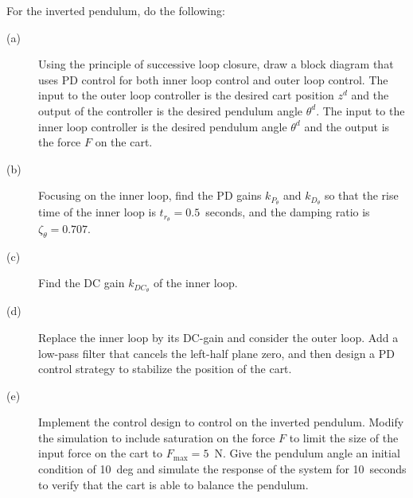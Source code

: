 For the inverted pendulum, do the following:
\begin{description}
\item[(a)] Using the principle of successive loop closure, draw a block diagram that uses PD control for both inner loop control and outer loop control. The input to the outer loop controller is the desired cart position $z^d$ and the output of the controller is the desired pendulum angle $\theta^d$.  The input to the inner loop controller is the desired pendulum angle $\theta^d$ and the output is the force $F$ on the cart.
\item[(b)] Focusing on the inner loop, find the PD gains $k_{P_\theta}$ and $k_{D_\theta}$ so that the rise time of the inner loop is $t_{r_\theta}=0.5$~seconds, and the damping ratio is $\zeta_{\theta}=0.707$.
\item[(c)] Find the DC gain $k_{DC_\theta}$ of the inner loop.
\item[(d)] Replace the inner loop by its DC-gain and consider the outer loop.  Add a low-pass filter that cancels the left-half plane zero, and then design a PD control strategy to stabilize the position of the cart.  
\item[(e)] Implement the control design to control on the inverted pendulum.  Modify the simulation to include saturation on the force $F$ to limit the size of the input force on the cart to $F_{\max}=5$~N. Give the pendulum angle an initial condition of 10~deg and simulate the response of the system for 10~seconds to verify that the cart is able to balance the pendulum. 
\end{description}
